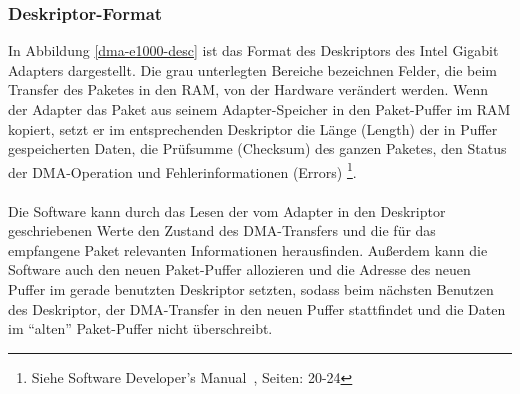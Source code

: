 {\subsubsection*{Deskriptor-Format}\label{sec:deskr_format} 
In Abbildung \ref{dma-e1000-desc} ist das Format des Deskriptors des Intel
Gigabit Adapters dargestellt. Die grau unterlegten Bereiche bezeichnen Felder,
die beim Transfer des Paketes in den RAM, von der Hardware verändert werden.
Wenn der Adapter das Paket aus seinem Adapter-Speicher in den Paket-Puffer im
RAM kopiert, setzt er im entsprechenden Deskriptor die Länge (Length) der in
Puffer gespeicherten Daten, die Prüfsumme (Checksum) des ganzen Paketes, den
Status der DMA-Operation und Fehlerinformationen (Errors) \footnote{Siehe
Software Developer’s Manual~\cite{e1000_sdm}, Seiten: 20-24}.\\\\
%
Die Software kann durch das Lesen der vom Adapter in den Deskriptor
geschriebenen Werte den Zustand des DMA-Transfers und die für das empfangene
Paket relevanten Informationen herausfinden. Außerdem kann die Software auch den
neuen Paket-Puffer allozieren und die Adresse des neuen Puffer im gerade
benutzten Deskriptor setzten, sodass beim nächsten Benutzen des Deskriptor, der
DMA-Transfer in den neuen Puffer stattfindet und die Daten im ``alten''
Paket-Puffer nicht überschreibt.
}
